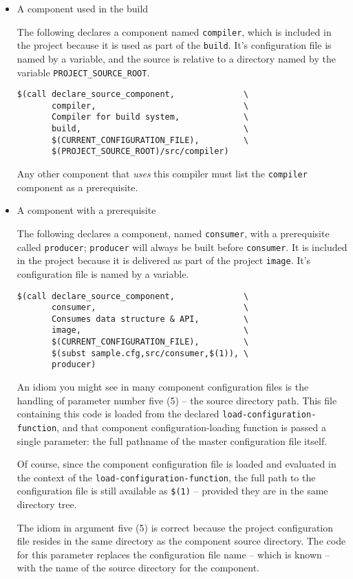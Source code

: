 \begin{itemize}
\item A component used in the build

The following declares a component named \texttt{compiler}, which is
included in the project because it is used as part of the
\texttt{build}.  It's configuration file is named by a \make variable,
and the source is relative to a directory named by the variable
\texttt{PROJECT\_SOURCE\_ROOT}.

\begin{verbatim}
$(call declare_source_component,              \
       compiler,                              \
       Compiler for build system,             \
       build,                                 \
       $(CURRENT_CONFIGURATION_FILE),         \
       $(PROJECT_SOURCE_ROOT)/src/compiler)
\end{verbatim}

Any other component that \emph{uses} this compiler must list the
\texttt{compiler} component as a prerequisite.

\item A component with a prerequisite

The following declares a component, named \texttt{consumer}, with a
prerequisite called \texttt{producer}; \texttt{producer} will always
be built before \texttt{consumer}.  It is included in the project
because it is delivered as part of the project \texttt{image}.  It's
configuration file is named by a \make variable.

\begin{verbatim}
$(call declare_source_component,              \
       consumer,                              \
       Consumes data structure & API,         \
       image,                                 \
       $(CURRENT_CONFIGURATION_FILE),         \
       $(subst sample.cfg,src/consumer,$(1)), \
       producer)
\end{verbatim}

An idiom you might see in many component configuration files is the
handling of parameter number five (5) -- the source directory path.
This file containing this code is loaded from the declared
\texttt{load-configuration-function}, and that component
configuration-loading function is passed a single parameter: the full
pathname of the master configuration file itself.

Of course, since the component configuration file is loaded and
evaluated in the context of the \texttt{load-configuration-function},
the full path to the configuration file is still available as
\texttt{\$(1)} -- provided they are in the same directory tree.

The idiom in argument five (5) is correct because the project
configuration file resides in the same directory as the component
source directory.  The code for this parameter replaces the
configuration file name -- which is known -- with the name of the
source directory for the component.

\end{itemize}


